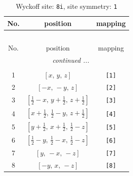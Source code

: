 \documentclass[fleqn,8pt]{jsarticle}
\begin{document}
\renewcommand{\arraystretch}{1.2}
\begin{longtable}{ccc}
\caption{Wyckoff site: {\tt 8i}, site symmetry: {\tt 1}}
 \\
 \hline \hline
No. & position & mapping \\ \hline \endfirsthead

\multicolumn{2}{l}{\tablename\ \thetable{}} \\
 \hline \hline
No. & position & mapping \\ \hline \endhead

 \hline \hline
\multicolumn{2}{r}{\footnotesize\it continued ...} \\ \endfoot

 \hline \hline
\multicolumn{2}{r}{} \\ \endlastfoot

1 & $\left[ x,\, y,\, z \right]$ & {\tt [1]} \\ \hline
2 & $\left[ - x,\, - y,\, z \right]$ & {\tt [2]} \\ \hline
3 & $\left[ \frac{1}{2} - x,\, y + \frac{1}{2},\, z + \frac{1}{2} \right]$ & {\tt [3]} \\ \hline
4 & $\left[ x + \frac{1}{2},\, \frac{1}{2} - y,\, z + \frac{1}{2} \right]$ & {\tt [4]} \\ \hline
5 & $\left[ y + \frac{1}{2},\, x + \frac{1}{2},\, \frac{1}{2} - z \right]$ & {\tt [5]} \\ \hline
6 & $\left[ \frac{1}{2} - y,\, \frac{1}{2} - x,\, \frac{1}{2} - z \right]$ & {\tt [6]} \\ \hline
7 & $\left[ y,\, - x,\, - z \right]$ & {\tt [7]} \\ \hline
8 & $\left[ - y,\, x,\, - z \right]$ & {\tt [8]} \\
\end{longtable}
\end{document}
